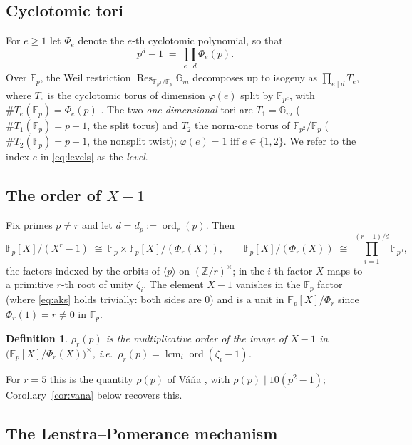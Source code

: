 \documentclass[11pt]{article}
\newtheorem{definition}[theorem]{Definition}
\theoremstyle{remark}
\newcommand{\Z}{\mathbb{Z}}
\newcommand{\F}{\mathbb{F}}
\newcommand{\Gm}{\mathbb{G}_m}
\DeclareMathOperator{\lcm}{lcm}
\DeclareMathOperator{\ord}{ord}
\DeclareMathOperator{\Res}{Res}
\begin{document}
\subsection{Cyclotomic tori}

For $e \ge 1$ let $\Phi_e$ denote the $e$-th cyclotomic polynomial, so that
\begin{equation}\label{eq:levels}
p^d - 1 \;=\; \prod_{e \mid d} \Phi_e(p).
\end{equation}
Over $\F_p$, the Weil restriction $\Res_{\F_{p^d}/\F_p}\Gm$ decomposes up to
isogeny as $\prod_{e \mid d} T_e$, where $T_e$ is the cyclotomic torus of
dimension $\varphi(e)$ split by $\F_{p^e}$, with
$\#T_e(\F_p) = \Phi_e(p)$ \cite{Vosk,RS}. The two \emph{one-dimensional}
tori are $T_1 = \Gm$ ($\#T_1(\F_p) = p-1$, the split torus) and $T_2$ the
norm-one torus of $\F_{p^2}/\F_p$ ($\#T_2(\F_p) = p+1$, the nonsplit twist);
$\varphi(e) = 1$ iff $e \in \{1,2\}$. We refer to the index $e$ in
\eqref{eq:levels} as the \emph{level}.

\subsection{The order of $X-1$}

Fix primes $p \ne r$ and let $d = d_p := \ord_r(p)$. Then
\[
\F_p[X]/(X^r-1) \;\cong\; \F_p \times \F_p[X]/(\Phi_r(X)), \qquad
\F_p[X]/(\Phi_r(X)) \;\cong\; \prod_{i=1}^{(r-1)/d} \F_{p^{d}},
\]
the factors indexed by the orbits of $\langle p \rangle$ on
$(\Z/r)^\times$; in the $i$-th factor $X$ maps to a primitive $r$-th root of
unity $\zeta_i$. The element $X - 1$ vanishes in the $\F_p$ factor (where
\eqref{eq:aks} holds trivially: both sides are $0$) and is a unit in
$\F_p[X]/\Phi_r$ since $\Phi_r(1) = r \ne 0$ in $\F_p$.

\begin{definition}\label{def:rho}
$\rho_r(p)$ is the multiplicative order of the image of $X-1$ in
$\bigl(\F_p[X]/\Phi_r(X)\bigr)^\times$, i.e.\
$\rho_r(p) = \lcm_i \ord(\zeta_i - 1)$.
\end{definition}

For $r = 5$ this is the quantity $\rho(p)$ of V\'a\v{n}a \cite{Vana}, with
$\rho(p) \mid 10(p^2-1)$; Corollary~\ref{cor:vana} below recovers this.

\subsection{The Lenstra--Pomerance mechanism}
\end{document}
